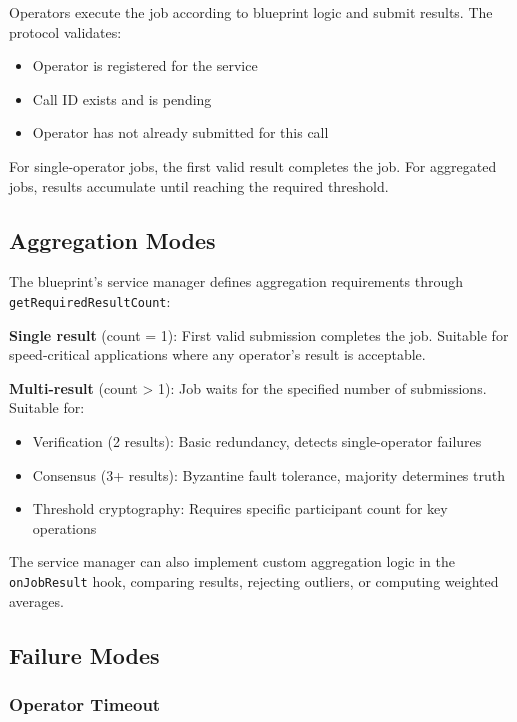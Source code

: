 \documentclass[11pt,a4paper]{article}
\begin{document}
Operators execute the job according to blueprint logic and submit results. The protocol validates:
\begin{itemize}[noitemsep]
    \item Operator is registered for the service
    \item Call ID exists and is pending
    \item Operator has not already submitted for this call
\end{itemize}

For single-operator jobs, the first valid result completes the job. For aggregated jobs, results accumulate until reaching the required threshold.

\subsection{Aggregation Modes}

The blueprint's service manager defines aggregation requirements through \texttt{getRequiredResultCount}:

\textbf{Single result} (count = 1): First valid submission completes the job. Suitable for speed-critical applications where any operator's result is acceptable.

\textbf{Multi-result} (count > 1): Job waits for the specified number of submissions. Suitable for:
\begin{itemize}[noitemsep]
    \item Verification (2 results): Basic redundancy, detects single-operator failures
    \item Consensus (3+ results): Byzantine fault tolerance, majority determines truth
    \item Threshold cryptography: Requires specific participant count for key operations
\end{itemize}

The service manager can also implement custom aggregation logic in the \texttt{onJobResult} hook, comparing results, rejecting outliers, or computing weighted averages.

\subsection{Failure Modes}

\subsubsection{Operator Timeout}
\end{document}
